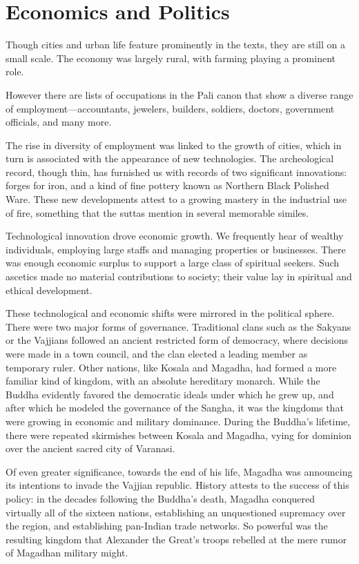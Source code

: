 \documentclass[12pt,openany]{book}%
\begin{document}
\section*{Economics and Politics}

Though cities and urban life feature prominently in the texts, they are still on a small scale. The economy was largely rural, with farming playing a prominent role.

However there are lists of occupations in the Pali canon that show a diverse range of employment—accountants, jewelers, builders, soldiers, doctors, government officials, and many more.

The rise in diversity of employment was linked to the growth of cities, which in turn is associated with the appearance of new technologies. The archeological record, though thin, has furnished us with records of two significant innovations: forges for iron, and a kind of fine pottery known as Northern Black Polished Ware. These new developments attest to a growing mastery in the industrial use of fire, something that the suttas mention in several memorable similes.

Technological innovation drove economic growth. We frequently hear of wealthy individuals, employing large staffs and managing properties or businesses. There was enough economic surplus to support a large class of spiritual seekers. Such ascetics made no material contributions to society; their value lay in spiritual and ethical development.

These technological and economic shifts were mirrored in the political sphere. There were two major forms of governance. Traditional clans such as the Sakyans or the Vajjians followed an ancient restricted form of democracy, where decisions were made in a town council, and the clan elected a leading member as temporary ruler. Other nations, like Kosala and Magadha, had formed a more familiar kind of kingdom, with an absolute hereditary monarch. While the Buddha evidently favored the democratic ideals under which he grew up, and after which he modeled the governance of the Sangha, it was the kingdoms that were growing in economic and military dominance. During the Buddha’s lifetime, there were repeated skirmishes between Kosala and Magadha, vying for dominion over the ancient sacred city of Varanasi.

Of even greater significance, towards the end of his life, Magadha was announcing its intentions to invade the Vajjian republic. History attests to the success of this policy: in the decades following the Buddha’s death, Magadha conquered virtually all of the sixteen nations, establishing an unquestioned supremacy over the region, and establishing pan-Indian trade networks. So powerful was the resulting kingdom that Alexander the Great’s troops rebelled at the mere rumor of Magadhan military might.
\end{document}
